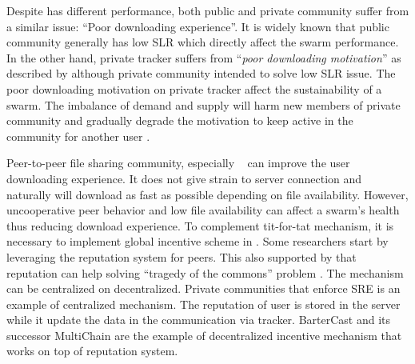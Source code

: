 Despite has different performance, both public and private community suffer from a similar issue: ``Poor downloading experience''. It is widely known that public community generally has low SLR which directly affect the swarm performance. In the other hand, private tracker suffers from ``\textit{poor downloading motivation}'' as described by \citeauthor{2014:sustainabilitytorrent:chen}\cite{2014:sustainabilitytorrent:chen} although private community intended to solve low SLR issue. The poor downloading motivation on private tracker affect the sustainability of a swarm. The imbalance of demand and supply will harm new members of private community and gradually degrade the motivation to keep active in the community for another user \cite{2014:sustainabilitytorrent:chen}.

Peer-to-peer file sharing community, especially \bt~ can improve the user downloading experience. It does not give strain to server connection and naturally will download as fast as possible depending on file availability. However, uncooperative peer behavior and low file availability can affect a swarm's health thus reducing download experience. To complement tit-for-tat mechanism, it is necessary to implement global incentive scheme in \bt. Some researchers start by leveraging the reputation system for peers. This also supported by \citeauthor{2002:reputationtotragedy:milinski} that reputation can help solving ``tragedy of the commons'' problem \cite{2002:reputationtotragedy:milinski}. The mechanism can be centralized on decentralized. Private communities that enforce SRE is an example of centralized mechanism. The reputation of user is stored in the server while it update the data in the communication via tracker. BarterCast \cite{2009:bartercast:meulpolder} and its successor MultiChain \cite{2015:multichain:norberhuis} are the example of decentralized incentive mechanism that works on top of reputation system. 



